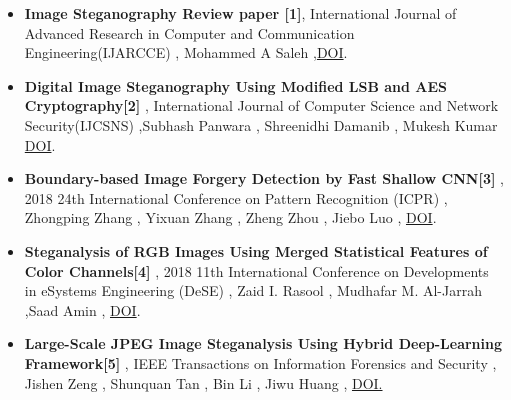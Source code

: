 \documentclass{beamer} %
\theoremstyle{definition} %
\begin{document}
\begin{itemize}
	\item{\textbf{Image Steganography Review paper [1]}, International Journal of Advanced Research in Computer and Communication Engineering(IJARCCE) , Mohammed A  Saleh ,\href{https://ijarcce.com/wp-content/uploads/2018/10/IJARCCE.2018.7910.pdf} {DOI}. }
\end{itemize}

\begin{itemize}
	\item{\textbf{Digital Image Steganography Using Modified LSB and AES Cryptography[2]} ,   International Journal of Computer Science and Network Security(IJCSNS) ,Subhash Panwara , Shreenidhi Damanib , Mukesh Kumar \href{http://www.ijrerd.com/papers/v3-i6/3-IJRERD-C149.pdf}{DOI}. }
\end{itemize}

\begin{itemize}
	\item{\textbf{Boundary-based Image Forgery Detection by Fast Shallow CNN[3]} , 2018 24th International Conference on Pattern Recognition (ICPR) , Zhongping Zhang , Yixuan Zhang , Zheng Zhou , Jiebo Luo , \href{https://doi.org/10.1109/ICPR.2018.8545074} {DOI}. }

\end{itemize}

\begin{itemize}
	\item {\textbf{Steganalysis of RGB Images Using Merged Statistical Features of Color Channels[4]} , 2018 11th International Conference on Developments in eSystems Engineering (DeSE) , Zaid I.  Rasool , Mudhafar M.  Al-Jarrah ,Saad Amin , \href{https://doi.org/10.1109/DeSE.2018.00048}{DOI}. }
\end{itemize}
\begin{itemize}
	\item {\textbf{Large-Scale JPEG Image Steganalysis Using
			Hybrid Deep-Learning Framework[5]} ,  IEEE Transactions on Information Forensics and Security , Jishen Zeng  , Shunquan Tan  , Bin Li , Jiwu Huang , \href{https://doi.org/10.1109/TIFS.2017.2779446}{DOI. } }
\end{itemize}
\end{document}
